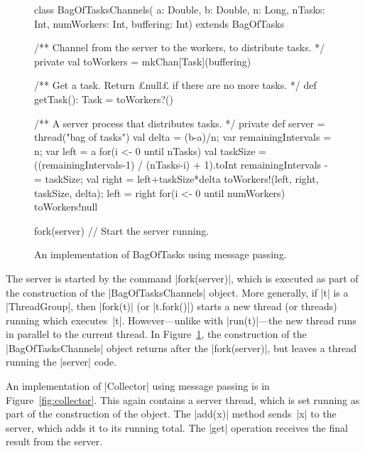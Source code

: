\begin{figure}
\begin{scala}
class BagOfTasksChannels(
  a: Double, b: Double, n: Long, nTasks: Int, numWorkers: Int, buffering: Int)
    extends BagOfTasks{
  /** Channel from the server to the workers, to distribute tasks. */
  private val toWorkers = mkChan[Task](buffering)

  /** Get a task.  Return £null£ if there are no more tasks. */
  def getTask(): Task = toWorkers?() 

  /** A server process that distributes tasks. */
  private def server = thread("bag of tasks"){
    val delta = (b-a)/n; var remainingIntervals = n; var left = a
    for(i <- 0 until nTasks){
      val taskSize = ((remainingIntervals-1) / (nTasks-i) + 1).toInt
      remainingIntervals -= taskSize; val right = left+taskSize*delta
      toWorkers!(left, right, taskSize, delta); left = right
    }
    for(i <- 0 until numWorkers) toWorkers!null
  }

  fork(server)  // Start the server running.
}
\end{scala}
\caption{An implementation of {\scalashape BagOfTasks} using message passing.}
\label{fig:bagOfTasksObject}
\end{figure}


The server is started by the command |fork(server)|, which is executed as part
of the construction of the |BagOfTasksChannels| object.
%
More generally, if |t| is a |ThreadGroup|, then |fork(t)| (or |t.fork()|)
starts a new thread (or threads) running which executes~|t|.  However---unlike
with |run(t)|---the new thread runs in parallel to the current thread.  In
Figure~\ref{fig:bagOfTasksObject}, the construction of the
|BagOfTasksChannels| object returns after the |fork(server)|, but leaves a
thread running the |server| code.


An implementation of |Collector| using message passing is in
Figure~\ref{fig:collector}.  This again contains a server thread, which is set
running as part of the construction of the object.  The |add(x)| method
sends~|x| to the server, which adds it to its running total.  The |get|
operation receives the final result from the server.


